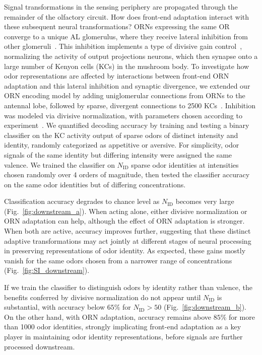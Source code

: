 \documentclass[10pt,prl,aps,showpacs,twocolumn,unsortedaddress,showkeys,linenumbers]{revtex4-1}
\begin{document}
Signal transformations in the sensing periphery are propagated through the remainder of the olfactory circuit. How does front-end adaptation interact with these subsequent neural transformations? ORNs expressing the same OR converge to a unique AL glomerulus, where they receive lateral inhibition from other glomeruli~\cite{lateral_inh, lateral_inh_asahina}. This inhibition implements a type of divisive gain control~\cite{divisive_normalization}, normalizing the activity of output projections neurons, which then synapse onto a large number of Kenyon cells (KCs) in the mushroom body. To investigate how odor representations are affected by interactions between front-end ORN adaptation and this lateral inhibition and synaptic divergence, we extended our ORN encoding model by adding uniglomerular connections from ORNs to the antennal lobe, followed by sparse, divergent connections to 2500 KCs~\cite{memory_review, litwinkumar, abbott_axel}. Inhibition was modeled via divisive normalization, with parameters chosen according to experiment~\cite{divisive_normalization}.
We quantified decoding accuracy by training and testing a binary classifier on the KC activity output of sparse odors of distinct intensity and identity, randomly categorized as appetitive or aversive. For simplicity, odor signals of the same identity but differing intensity were assigned the same valence. We trained the classifier on $N_{{\text {ID}}}$ sparse odor identities at intensities chosen randomly over 4 orders of magnitude, then tested the classifier accuracy on the same odor identities but of differing concentrations. 

Classification accuracy degrades to chance level as $N_{\text {ID}}$ becomes very large (Fig.~\ref{fig:downstream_a}). When acting alone, either divisive normalization or ORN adaptation can help, although the effect of ORN adaptation is stronger. When both are active, accuracy improves further, suggesting that these distinct adaptive transformations may act jointly at different stages of neural processing in preserving representations of odor identity. As expected, these gains mostly vanish for the same odors chosen from a narrower range of concentrations (Fig.~\ref{fig:SI_downstream}).

If we train the classifier to distinguish odors by identity rather than valence, the benefits conferred by divisive normalization do not appear until $N_{{\text {ID}}}$ is substantial, with accuracy below $65\%$ for $N_{{\text {ID}}} > 50$ (Fig.~\ref{fig:downstream_b}). On the other hand, with ORN adaptation, accuracy remains above $85\%$ for more than 1000 odor identities, strongly implicating front-end adaptation as a key player in maintaining odor identity representations, before signals are further processed downstream. 
\end{document}
